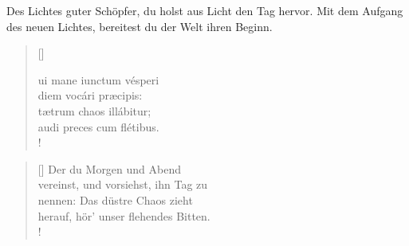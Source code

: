 \medskip

\begin{sloppypar}
{\noindent\rm{ Des Lichtes guter Schöpfer, du holst aus Licht den Tag hervor.
Mit dem Aufgang des neuen Lichtes, bereitest du der Welt ihren Beginn.}}
\end{sloppypar}

\medskip

{\setlength{\columnsep}{1cm}
\begin{multicols}{2} 
\begin{verse}[\versewidth]
 
{\small{
ui mane iunctum vésperi\\
diem vocári præcipis:\\
tætrum chaos illábitur;\\
audi preces cum flétibus.\\!}}
\end{verse}

\columnbreak

\begin{verse}[\versewidth]
{\small\rm{ Der du Morgen und Abend\\
vereinst, und vorsiehst, ihn Tag zu\\
nennen: Das düstre Chaos zieht\\
herauf, hör' unser flehendes Bitten.\\!}}
\end{verse}
\end{multicols}
}

